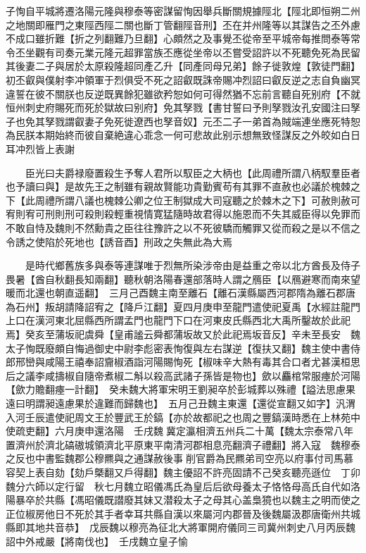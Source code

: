 子恂自平城將遷洛陽元隆與穆泰等密謀留恂因舉兵斷關規據陘北【陘北即恒朔二州之地關即雁門之東陘西陘二關也斷丁管翻陘音刑】丕在并州隆等以其謀告之丕外慮不成口雖折難【折之列翻難乃旦翻】心頗然之及事覺丕從帝至平城帝每推問泰等常令丕坐觀有司奏元業元隆元超罪當族丕應從坐帝以丕嘗受詔許以不死聽免死為民留其後妻二子與居於太原殺隆超同產乙升【同產同母兄弟】餘子徙敦煌【敦徒門翻】初丕叡與僕射李冲領軍于烈俱受不死之詔叡既誅帝賜冲烈詔曰叡反逆之志自負幽冥違誓在彼不關朕也反逆既異餘犯雖欲矜恕如何可得然猶不忘前言聽自死别府【不就恒州刺史府賜死而死於獄故曰别府】免其孥戮【書甘誓曰予則孥戮汝孔安國注曰孥子也免其孥戮謂叡妻子免死徙遼西也孥音奴】元丕二子一弟首為賊端連坐應死特恕為民朕本期始終而彼自棄絶違心乖念一何可悲故此别示想無致怪謀反之外皎如白日耳冲烈皆上表謝

　　臣光曰夫爵禄廢置殺生予奪人君所以馭臣之大柄也【此周禮所謂八柄馭羣臣者也予讀曰與】是故先王之制雖有親故賢能功貴勤賓苟有其罪不直赦也必議於槐棘之下【此周禮所謂八議也槐棘公卿之位王制獄成大司寇聽之於棘木之下】可赦則赦可宥則宥可刑則刑可殺則殺輕重視情寛猛隨時故君得以施恩而不失其威臣得以免罪而不敢自恃及魏則不然勳貴之臣往往豫許之以不死彼驕而觸罪又從而殺之是以不信之令誘之使陷於死地也【誘音酉】刑政之失無此為大焉

　　是時代鄉舊族多與泰等連謀唯于烈無所染涉帝由是益重之帝以北方酋長及侍子畏暑【酋自秋翻長知兩翻】聽秋朝洛陽春還部落時人謂之鴈臣【以鴈避寒而南來望暖而北還也朝直遥翻】　三月己酉魏主南至離石【離石漢縣屬西河郡隋為離石郡唐為石州】叛胡請降詔宥之【降戶江翻】夏四月庚申至龍門遣使祀夏禹【水經註龍門上口在漢河東北屈縣西所謂孟門也龍門下口在河東皮氏縣西北大禹所鑿故於此祀焉】癸亥至蒲坂祀虞舜【皇甫謐云舜都蒲坂故又於此祀焉坂音反】辛未至長安　魏太子恂既廢頗自悔過御史中尉李彪密表恂復與左右謀逆【復扶又翻】魏主使中書侍郎邢巒與咸陽王禧奉詔齎椒酒詣河陽賜恂死【椒味辛大熱有毒其合口者尤甚漢桓思后之議李咸擣椒自隨帝煮椒二斛以殺高武諸子孫皆是物也】歛以麤棺常服瘞於河陽【歛力贍翻瘞一計翻】　癸未魏大將軍宋明王劉昶卒於彭城葬以殊禮【謚法思慮果遠曰明謂昶遠慮果於違難而歸魏也】　五月己丑魏主東還【還從宣翻又如字】汎渭入河壬辰遣使祀周文王於豐武王於鎬【亦於故都祀之也周之豐鎬漢時悉在上林苑中使疏吏翻】六月庚申還洛陽　壬戌魏冀定瀛相濟五州兵二十萬【魏太宗泰常八年置濟州於濟北碻磝城領濟北平原東平南清河郡相息亮翻濟子禮翻】將入寇　魏穆泰之反也中書監魏郡公穆羆與之通謀赦後事削官爵為民羆弟司空亮以府事付司馬慕容契上表自劾【劾戶槩翻又戶得翻】魏主優詔不許亮固請不己癸亥聽亮遜位　丁卯魏分六師以定行留　秋七月魏立昭儀馮氏為皇后后欲母養太子恪恪母高氏自代如洛陽暴卒於共縣【馮昭儀既譛廢其妹又潜殺太子之母其心盖梟獍也以魏主之明而使之正位椒房他日不死於其手者幸耳共縣自漢以來屬河内郡晉及後魏屬汲郡唐衛州共城縣即其地共音恭】　戊辰魏以穆亮為征北大將軍開府儀同三司冀州刺史八月丙辰魏詔中外戒嚴【將南伐也】　壬戌魏立皇子愉

